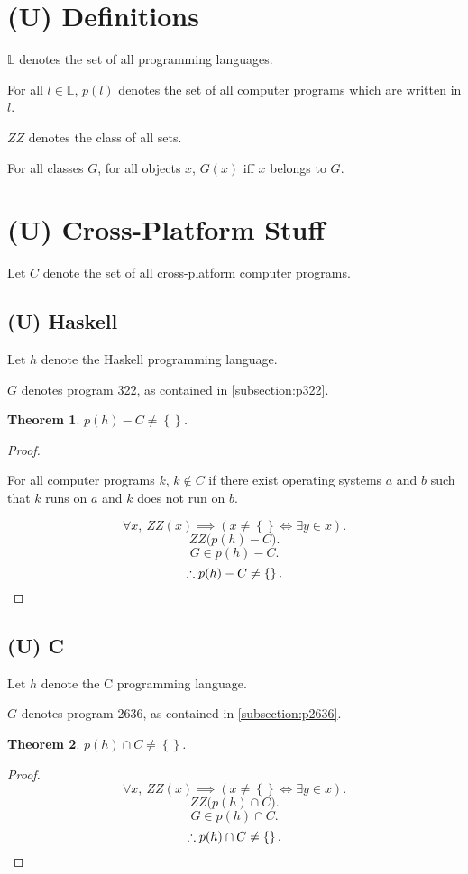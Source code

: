 \documentclass{article}
\newtheorem{thm}{Theorem}
\begin{document}
	\section{(U) Definitions}
		$\mathbb L$ denotes the set of all programming languages.

		For all $l \in \mathbb L$, $p(l)$ denotes the set of all computer
		programs which are written in $l$.

		$\mathit{ZZ}$ denotes the class of all sets.

		For all classes $G$, for all objects $x$, $G(x)$ iff $x$ belongs to
		$G$.
	\section{(U) Cross-Platform Stuff}
			Let $C$ denote the set of all cross-platform computer programs.
		\subsection{(U) Haskell}
			Let $h$ denote the Haskell programming language.

			$G$ denotes program 322, as contained in \cref{subsection:p322}.
			\begin{thm}
				$p(h) - C \neq \left\{\right\}$.
			\end{thm}
			\begin{proof}
				${}$

				For all computer programs $k$, $k \notin C$ if there exist
				operating systems $a$ and $b$ such that $k$ runs on $a$ and
				$k$ does not run on $b$.

				\[
					\forall x,\ 
					\mathit{ZZ}(x) \implies 
					\left(x \neq \left\{\right\} \iff \exists y \in x\right).
				\]
				\[
					\mathit{ZZ}\big(p(h) - C\big).
				\]
				\[
					G \in p(h) - C.
				\]
				\[
					\therefore p(h) - C \neq \left\{\right\}.\qedhere
				\]
			\end{proof}
		\subsection{(U) C}
			Let $h$ denote the C programming language.

			$G$ denotes program 2636, as contained in \cref{subsection:p2636}.
			\begin{thm}
				$p(h) \cap C \neq \left\{\right\}$.
			\end{thm}
			\begin{proof}
				\[
					\forall x,\ 
					\mathit{ZZ}(x) \implies 
					\left(x \neq \left\{\right\} \iff \exists y \in x\right).
				\]
				\[
					\mathit{ZZ}\big(p(h) \cap C\big).
				\]
				\[
					G \in p(h) \cap C.
				\]
				\[
					\therefore p(h) \cap C \neq \left\{\right\}.\qedhere
				\]
			\end{proof}
\end{document}
